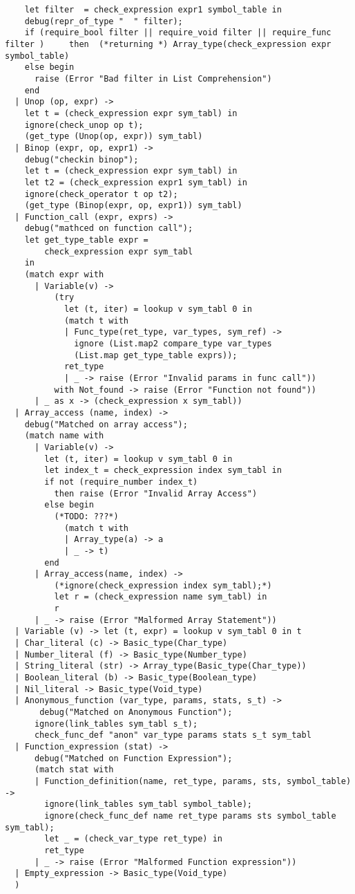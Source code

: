 \begin{verbatim}
    let filter  = check_expression expr1 symbol_table in
    debug(repr_of_type "  " filter);
    if (require_bool filter || require_void filter || require_func filter )     then  (*returning *) Array_type(check_expression expr symbol_table)
    else begin
      raise (Error "Bad filter in List Comprehension")
    end
  | Unop (op, expr) ->
    let t = (check_expression expr sym_tabl) in
    ignore(check_unop op t);
    (get_type (Unop(op, expr)) sym_tabl)
  | Binop (expr, op, expr1) ->
    debug("checkin binop");
    let t = (check_expression expr sym_tabl) in
    let t2 = (check_expression expr1 sym_tabl) in
    ignore(check_operator t op t2);
    (get_type (Binop(expr, op, expr1)) sym_tabl)
  | Function_call (expr, exprs) ->
    debug("mathced on function call");
    let get_type_table expr =
        check_expression expr sym_tabl
    in
    (match expr with
      | Variable(v) ->
          (try
            let (t, iter) = lookup v sym_tabl 0 in
            (match t with
            | Func_type(ret_type, var_types, sym_ref) ->
              ignore (List.map2 compare_type var_types
              (List.map get_type_table exprs));
            ret_type
            | _ -> raise (Error "Invalid params in func call"))
          with Not_found -> raise (Error "Function not found"))
      | _ as x -> (check_expression x sym_tabl))
  | Array_access (name, index) ->
    debug("Matched on array access");
    (match name with
      | Variable(v) ->
        let (t, iter) = lookup v sym_tabl 0 in
        let index_t = check_expression index sym_tabl in
        if not (require_number index_t)
          then raise (Error "Invalid Array Access")
        else begin
          (*TODO: ???*)
            (match t with
            | Array_type(a) -> a
            | _ -> t)
        end
      | Array_access(name, index) ->
          (*ignore(check_expression index sym_tabl);*)
          let r = (check_expression name sym_tabl) in
          r
      | _ -> raise (Error "Malformed Array Statement"))
  | Variable (v) -> let (t, expr) = lookup v sym_tabl 0 in t
  | Char_literal (c) -> Basic_type(Char_type)
  | Number_literal (f) -> Basic_type(Number_type)
  | String_literal (str) -> Array_type(Basic_type(Char_type))
  | Boolean_literal (b) -> Basic_type(Boolean_type)
  | Nil_literal -> Basic_type(Void_type)
  | Anonymous_function (var_type, params, stats, s_t) ->
       debug("Matched on Anonymous Function");
      ignore(link_tables sym_tabl s_t);
      check_func_def "anon" var_type params stats s_t sym_tabl
  | Function_expression (stat) ->
      debug("Matched on Function Expression");
      (match stat with
      | Function_definition(name, ret_type, params, sts, symbol_table) ->
        ignore(link_tables sym_tabl symbol_table);
        ignore(check_func_def name ret_type params sts symbol_table sym_tabl);
        let _ = (check_var_type ret_type) in
        ret_type
      | _ -> raise (Error "Malformed Function expression"))
  | Empty_expression -> Basic_type(Void_type)
  )


\end{verbatim}
